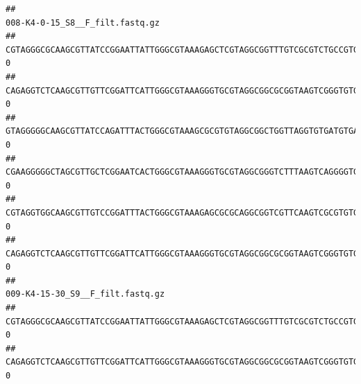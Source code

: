 \documentclass[]{article}
\begin{document}
\begin{verbatim}
##                                                                                                                                                                                                                                                           008-K4-0-15_S8__F_filt.fastq.gz
## CGTAGGGCGCAAGCGTTATCCGGAATTATTGGGCGTAAAGAGCTCGTAGGCGGTTTGTCGCGTCTGCCGTGAAAGTCCGGGGCTCAACTCCGGATCTGCGGTGGGTACGGGCAGACTAGAGTGATGTAGGGGAGACTGGAATTCCTGGTGTAGCGGTGAAATGCGCAGATATCAGGAGGAACACCGATGGCGAAGGCAGGTCTCTGGGCATTAACTGACGCTGAGGAGCGAAAGCATGGGGAGCGAACA                               0
## CAGAGGTCTCAAGCGTTGTTCGGATTCATTGGGCGTAAAGGGTGCGTAGGCGGCGCGGTAAGTCGGGTGTGAAATCTCGGAGCTTAACTCCGAAACTGCATTCGATACTGCCGTGCTTGAGGACTGGAGAGGAGACTGGAATTTACGGTGTAGCGGTGAAATGCGTAGATATCGTAAGGAAGACCAGTGGCGAAGGCGGGTCTCTGGACAGTTCCTGACGCTGAGGCACGAAGGCCAGGGGAGCAAACG                               0
## GTAGGGGGCAAGCGTTATCCAGATTTACTGGGCGTAAAGCGCGTGTAGGCGGCTGGTTAGGTGTGATGTGAAATCTTCCGGCTCAACCGGAAAACTGCATTGCAAACCGGCCTGGCTAGAGTGCAGGAGAGGGAAGCGGAATTCCAGGTGTAGCGGTGAAATGCGTAGATATCTGGAGGAACACCAGTGGCGAAGGCGGCTTCCTGGCCTGCAACTGACGCTGAGACGCGAAAGCGTGGGGAGCGAAC                                0
## CGAAGGGGGCTAGCGTTGCTCGGAATCACTGGGCGTAAAGGGTGCGTAGGCGGGTCTTTAAGTCAGGGGTGAAATCCTGGAGCTCAACTCCAGAACTGCCTTTGATACTGAAGATCTTGAGTTCGGGAGAGGTGAGTGGAACTGCGAGTGTAGAGGTGAAATTCGTAGATATTCGCAAGAACACCAGTGGCGAAGGCGGCTCACTGGCCCGATACTGACGCTGAGGCACGAAAGCGTGGGGAGCAAACA                               0
## CGTAGGTGGCAAGCGTTGTCCGGATTTACTGGGCGTAAAGAGCGCGCAGGCGGTCGTTCAAGTCGCGTGTGAAAGCCCCCGGCTCAACTGGGGAGGGTCACGCGATACTGATCGACTCGAAGGCAGGAGAGGGTAGTGGAATTCCCGGTGTAGTGGTGAAATGCGTAGATATCGGGAGGAACACCAGTGGCGAAGGCGACTACCTGGCCTGTTCTTGACGCTGAGGCGCGAAAGCTAGGGGAGCAAACG                               0
## CAGAGGTCTCAAGCGTTGTTCGGATTCATTGGGCGTAAAGGGTGCGTAGGCGGCGCGGTAAGTCGGGTGTGAAATCTCGGGGCTTAACTCCGAAACTGCATTCGATACTGCCGTGCTTGAGGACTGGAGAGGAGACTGGAATTTACGGTGTAGCGGTGAAATGCGTAGATATCGTAAGGAAGACCAGTGGCGAAGGCGGGTCTCTGGACAGTTCCTGACGCTGAGGCACGAAGGCCAGGGGAGCAAACG                               0
##                                                                                                                                                                                                                                                           009-K4-15-30_S9__F_filt.fastq.gz
## CGTAGGGCGCAAGCGTTATCCGGAATTATTGGGCGTAAAGAGCTCGTAGGCGGTTTGTCGCGTCTGCCGTGAAAGTCCGGGGCTCAACTCCGGATCTGCGGTGGGTACGGGCAGACTAGAGTGATGTAGGGGAGACTGGAATTCCTGGTGTAGCGGTGAAATGCGCAGATATCAGGAGGAACACCGATGGCGAAGGCAGGTCTCTGGGCATTAACTGACGCTGAGGAGCGAAAGCATGGGGAGCGAACA                                0
## CAGAGGTCTCAAGCGTTGTTCGGATTCATTGGGCGTAAAGGGTGCGTAGGCGGCGCGGTAAGTCGGGTGTGAAATCTCGGAGCTTAACTCCGAAACTGCATTCGATACTGCCGTGCTTGAGGACTGGAGAGGAGACTGGAATTTACGGTGTAGCGGTGAAATGCGTAGATATCGTAAGGAAGACCAGTGGCGAAGGCGGGTCTCTGGACAGTTCCTGACGCTGAGGCACGAAGGCCAGGGGAGCAAACG                                0

\end{verbatim}
\end{document}
